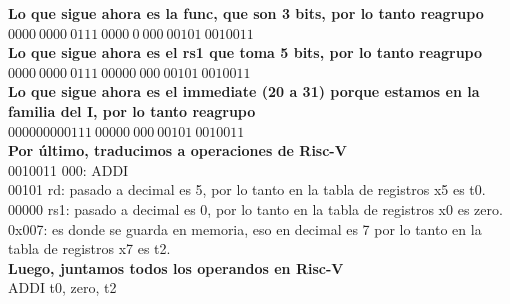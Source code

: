 \documentclass[10pt,a4paper]{article}
\begin{document}
\textbf{Lo que sigue ahora es la func, que son 3 bits, por lo tanto reagrupo} \\
$0000 \ 0000 \ 0111 \ 0000 \ 0 \ 000 \ 00101 \ 0010011$ \\

\textbf{Lo que sigue ahora es el rs1 que toma 5 bits, por lo tanto reagrupo} \\ 
$0000 \ 0000 \ 0111 \ 00000 \ 000 \ 00101 \ 0010011$ \\ 

\textbf{Lo que sigue ahora es el immediate (20 a 31) porque estamos en la familia del I, por lo tanto reagrupo} \\ 
$0000 0000 0111 \ 00000 \ 000 \ 00101 \ 0010011$ \\

\textbf{Por último, traducimos a operaciones de Risc-V} \\ 
0010011 000: ADDI  \\ 
00101 rd: pasado a decimal es 5, por lo tanto en la tabla de registros x5 es t0. \\
00000 rs1: pasado a decimal es 0, por lo tanto en la tabla de registros x0 es zero. \\
0x007: es donde se guarda en memoria, eso en decimal es 7 por lo tanto en la tabla de registros x7 es t2. \\ 

\textbf{Luego, juntamos todos los operandos en Risc-V} \\ 
ADDI t0, zero, t2
\end{document}
